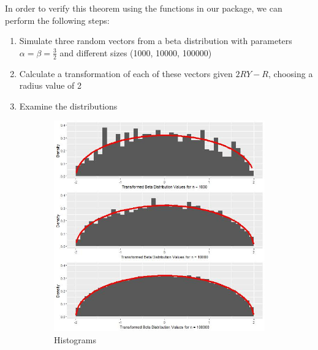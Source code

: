\documentclass[11pt]{asaproc}
\begin{document}
In order to verify this theorem using the functions in our package, we can perform the following steps:
\begin{enumerate}
    \item Simulate three random vectors from a beta distribution with parameters $\alpha = \beta = \frac{3}{2}$ and different sizes (1000, 10000, 100000)
    \item Calculate a transformation of each of these vectors given $2RY-R$, choosing a radius value of 2
    \item Examine the distributions
\end{enumerate}

\begin{figure}[H]
     \centering
     \begin{subfigure}[b]{0.4\textwidth}
         \centering
         \includegraphics[width=\textwidth]{figures/BetaTrans.jpeg}
         \caption{Histograms}
         \label{fig:betatrans_hist}
     \end{subfigure}
     \hfill
     \begin{subfigure}[b]{0.4\textwidth}
         \centering

\end{subfigure}
\end{figure}
\end{document}

